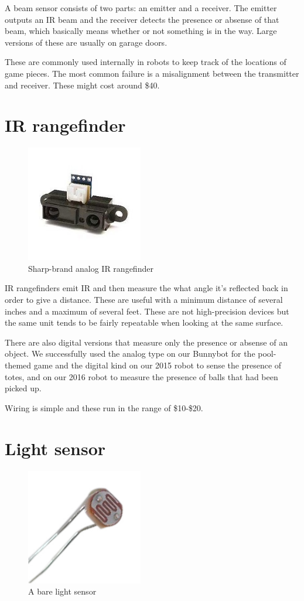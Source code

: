 \documentclass{article}
\begin{document}
A beam sensor consists of two parts: an emitter and a receiver.  The emitter outputs an IR beam and the receiver detects the presence or absense of that beam, which basically means whether or not something is in the way.  Large versions of these are usually on garage doors.

These are commonly used internally in robots to keep track of the locations of game pieces.  The most common failure is a misalignment between the transmitter and receiver.  These might cost around \$40.  

\section{IR rangefinder}
\begin{figure}[ht]
\centering
\includegraphics[width=2in]{ir-rangefinder.jpg}
\caption{Sharp-brand analog IR rangefinder}
\end{figure}

IR rangefinders emit IR and then measure the what angle it's reflected back in order to give a distance.  These are useful with a minimum distance of several inches and a maximum of several feet.  These are not high-precision devices but the same unit tends to be fairly repeatable when looking at the same surface.  

There are also digital versions that measure only the presence or absense of an object.  We successfully used the analog type on our Bunnybot for the pool-themed game and the digital kind on our 2015 robot to sense the presence of totes, and on our 2016 robot to measure the presence of balls that had been picked up.  

Wiring is simple and these run in the range of \$10-\$20.
\section{Light sensor}
\begin{figure}[ht]
\centering
\includegraphics[width=2in]{light_sensor.jpg}
\caption{A bare light sensor}
\end{figure}
\end{document}
